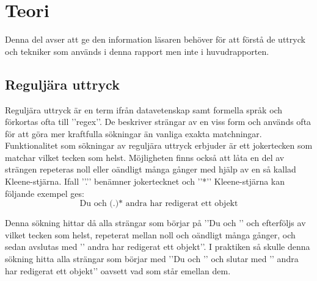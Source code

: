\section{Teori}
\label{sec:joel_a-theory}

Denna del avser att ge den information läsaren behöver för att förstå de uttryck och tekniker som används i denna rapport men inte i huvudrapporten.


\subsection*{Reguljära uttryck}
Reguljära uttryck är en term ifrån datavetenskap samt formella språk och förkortas ofta till ’’regex’’.  De beskriver strängar av en viss form och används ofta för att göra mer kraftfulla sökningar än vanliga exakta matchningar. Funktionalitet som sökningar av reguljära uttryck erbjuder är ett jokertecken som matchar vilket tecken som helst. Möjligheten finns också att låta en del av strängen repeteras noll eller oändligt många gånger med hjälp av en så kallad Kleene-stjärna. Ifall ’’.’’ benämner jokertecknet och ’’*’’ Kleene-stjärna kan följande exempel ges: $$\text{Du och (.)* andra har redigerat ett objekt}$$

Denna sökning hittar då alla strängar som börjar på ’’Du och ’’ och efterföljs av vilket tecken som helst, repeterat mellan noll och oändligt många gånger, och sedan avslutas med ’’ andra har redigerat ett objekt’’. I praktiken så skulle denna sökning hitta alla strängar som börjar med ’’Du och ’’ och slutar med ’’ andra har redigerat ett objekt’’ oavsett vad som står emellan dem.~\cite{kozen-automata}

